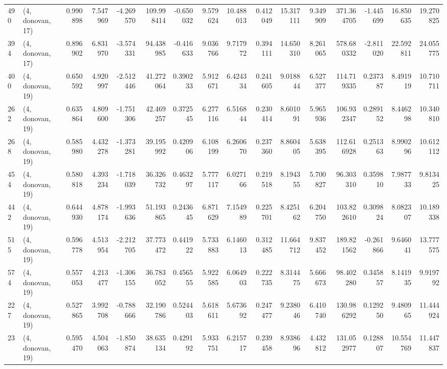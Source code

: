 \begin{tabular}{llrrrrrrrrrrrrrr}
490 &  (4, donovan, 17) &   0.990898 &   7.547969 &  -4.269570 &   109.998414 &  -0.650032 &   9.579624 &  10.488013 &  0.412049 &  15.317111 &   9.349909 &   371.364705 & -1.445699 &  16.850635 &  19.270825 \\
394 &  (4, donovan, 17) &   0.896902 &   6.831970 &  -3.574331 &    94.438985 &  -0.416633 &   9.036766 &   9.717972 &  0.394111 &  14.650310 &   8.261065 &   578.680332 & -2.811020 &  22.592811 &  24.055775 \\
400 &  (4, donovan, 19) &   0.650592 &   4.920997 &  -2.512446 &    41.272064 &   0.390233 &   5.912671 &   6.424334 &  0.241605 &   9.018844 &   6.527377 &   114.719335 &  0.237387 &   8.491919 &  10.710711 \\
262 &  (4, donovan, 19) &   0.635864 &   4.809600 &  -1.751306 &    42.469257 &   0.372545 &   6.277116 &   6.516844 &  0.230414 &   8.601091 &   5.965936 &   106.932347 &  0.289152 &   8.446298 &  10.340810 \\
268 &  (4, donovan, 19) &   0.585980 &   4.432278 &  -1.373281 &    39.195992 &   0.420906 &   6.108199 &   6.260670 &  0.237360 &   8.860405 &   5.638395 &   112.616928 &  0.251363 &   8.990296 &  10.612112 \\
454 &  (4, donovan, 19) &   0.580818 &   4.393234 &  -1.718039 &    36.326732 &   0.463297 &   5.777117 &   6.027166 &  0.219518 &   8.194355 &   5.700827 &    96.303310 &  0.359810 &   7.987733 &   9.813425 \\
442 &  (4, donovan, 19) &   0.644930 &   4.878174 &  -1.993636 &    51.193865 &   0.243645 &   6.871629 &   7.154989 &  0.225701 &   8.425162 &   6.204750 &   103.822610 &  0.309824 &   8.082307 &  10.189338 \\
515 &  (4, donovan, 19) &   0.596778 &   4.513954 &  -2.212705 &    37.773472 &   0.441922 &   5.733883 &   6.146013 &  0.312485 &  11.664712 &   9.837452 &   189.821562 & -0.261866 &   9.646041 &  13.777575 \\
574 &  (4, donovan, 19) &   0.557053 &   4.213477 &  -1.306155 &    36.783052 &   0.456555 &   5.922585 &   6.064903 &  0.222735 &   8.314475 &   5.666673 &    98.402280 &  0.345857 &   8.141935 &   9.919792 \\
227 &  (4, donovan, 19) &   0.527865 &   3.992708 &  -0.788666 &    32.190786 &   0.524403 &   5.618611 &   5.673692 &  0.247477 &   9.238046 &   6.410740 &   130.986292 &  0.129250 &   9.480965 &  11.444924 \\
23  &  (4, donovan, 19) &   0.595470 &   4.504063 &  -1.850874 &    38.635134 &   0.429192 &   5.933751 &   6.215717 &  0.239458 &   8.938696 &   4.432812 &   131.052977 &  0.128807 &  10.554769 &  11.447837 \\

\end{tabular}
